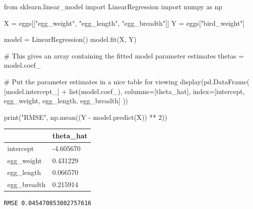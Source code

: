 \documentclass[
  letterpaper,
  DIV=11,
  numbers=noendperiod]{scrreprt}
\newenvironment{Shaded}{\begin{snugshade}}{\end{snugshade}}
\newcommand{\BuiltInTok}[1]{\textcolor[rgb]{0.00,0.23,0.31}{#1}}
\newcommand{\CommentTok}[1]{\textcolor[rgb]{0.37,0.37,0.37}{#1}}
\newcommand{\DecValTok}[1]{\textcolor[rgb]{0.68,0.00,0.00}{#1}}
\newcommand{\ImportTok}[1]{\textcolor[rgb]{0.00,0.46,0.62}{#1}}
\newcommand{\NormalTok}[1]{\textcolor[rgb]{0.00,0.23,0.31}{#1}}
\newcommand{\OperatorTok}[1]{\textcolor[rgb]{0.37,0.37,0.37}{#1}}
\newcommand{\StringTok}[1]{\textcolor[rgb]{0.13,0.47,0.30}{#1}}
\begin{document}
\begin{Shaded}
\begin{Highlighting}[]
\ImportTok{from}\NormalTok{ sklearn.linear\_model }\ImportTok{import}\NormalTok{ LinearRegression}
\ImportTok{import}\NormalTok{ numpy }\ImportTok{as}\NormalTok{ np}

\NormalTok{X }\OperatorTok{=}\NormalTok{ eggs[[}\StringTok{"egg\_weight"}\NormalTok{, }\StringTok{"egg\_length"}\NormalTok{, }\StringTok{"egg\_breadth"}\NormalTok{]]}
\NormalTok{Y }\OperatorTok{=}\NormalTok{ eggs[}\StringTok{"bird\_weight"}\NormalTok{]}

\NormalTok{model }\OperatorTok{=}\NormalTok{ LinearRegression()}
\NormalTok{model.fit(X, Y)}

\CommentTok{\# This gives an array containing the fitted model parameter estimates}
\NormalTok{thetas }\OperatorTok{=}\NormalTok{ model.coef\_}

\CommentTok{\# Put the parameter estimates in a nice table for viewing}
\NormalTok{display(pd.DataFrame(}
\NormalTok{  [model.intercept\_] }\OperatorTok{+} \BuiltInTok{list}\NormalTok{(model.coef\_),}
\NormalTok{  columns}\OperatorTok{=}\NormalTok{[}\StringTok{\textquotesingle{}theta\_hat\textquotesingle{}}\NormalTok{],}
\NormalTok{  index}\OperatorTok{=}\NormalTok{[}\StringTok{\textquotesingle{}intercept\textquotesingle{}}\NormalTok{, }\StringTok{\textquotesingle{}egg\_weight\textquotesingle{}}\NormalTok{, }\StringTok{\textquotesingle{}egg\_length\textquotesingle{}}\NormalTok{, }\StringTok{\textquotesingle{}egg\_breadth\textquotesingle{}}\NormalTok{]}
\NormalTok{))}

\BuiltInTok{print}\NormalTok{(}\StringTok{"RMSE"}\NormalTok{, np.mean((Y }\OperatorTok{{-}}\NormalTok{ model.predict(X)) }\OperatorTok{**} \DecValTok{2}\NormalTok{))}
\end{Highlighting}
\end{Shaded}

\begin{longtable}[]{@{}ll@{}}
\toprule\noalign{}
& theta\_hat \\
\midrule\noalign{}
\endhead
\bottomrule\noalign{}
\endlastfoot
intercept & -4.605670 \\
egg\_weight & 0.431229 \\
egg\_length & 0.066570 \\
egg\_breadth & 0.215914 \\
\end{longtable}

\begin{verbatim}
RMSE 0.045470853802757616
\end{verbatim}
\end{document}
